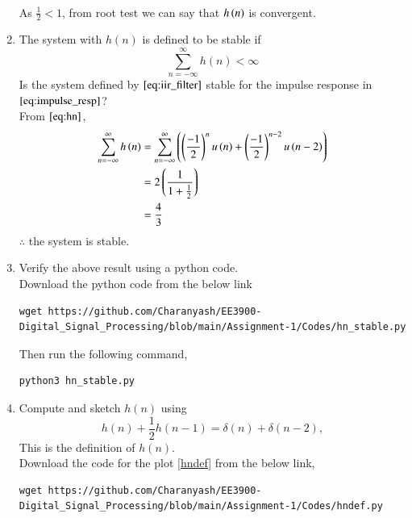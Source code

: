 \documentclass[journal,12pt,twocolumn]{IEEEtran}
\renewcommand\thesection{\arabic{section}}
\begin{document}
\begin{enumerate}[label=\thesection.\arabic*]
\begin{align}
           \end{align}
           As $\frac{1}{2} < 1$, from root test we can say that $h\left(n\right)$ is convergent.
     \item The system with $h(n)$ is defined to be stable if
           \begin{equation}
                \sum_{n=-\infty}^{\infty}h(n) < \infty
           \end{equation}
           Is the system defined by $\eqref{eq:iir_filter}$ stable for the impulse response in $\eqref{eq:impulse_resp}$?\\
           \solution From $\eqref{eq:hn}$,
           \begin{align}
                \sum_{n=-\infty}^{\infty}h\left(n\right) & = \sum_{n=-\infty}^{\infty}\left(\left(\frac{-1}{2}\right)^{n} u\left(n\right) + \left(\frac{-1}{2}\right)^{n-2} u\left(n-2\right)\right) \\
                                                   & = 2\left(\frac{1}{1+\frac{1}{2}}\right)                                                                           \\
                                                   & = \frac{4}{3}
           \end{align}
           $\therefore$ the system is stable.
     \item Verify the above result using a python code.\\
           \solution Download the python code from the below link
           \begin{lstlisting}
wget https://github.com/Charanyash/EE3900-Digital_Signal_Processing/blob/main/Assignment-1/Codes/hn_stable.py
\end{lstlisting}
           Then run the following command,
           \begin{lstlisting}
python3 hn_stable.py
\end{lstlisting}
     \item Compute and sketch $h(n)$ using
           \begin{equation}
                \label{eq:iir_filter_h}
                h(n) + \frac{1}{2}h(n-1) = \delta(n) + \delta(n-2),
           \end{equation}
           This is the definition of $h(n)$.\\
           \solution Download the code for the plot \ref{hndef} from the below link,
           \begin{lstlisting}
wget https://github.com/Charanyash/EE3900-Digital_Signal_Processing/blob/main/Assignment-1/Codes/hndef.py

\end{lstlisting}
\end{enumerate}
\end{document}
